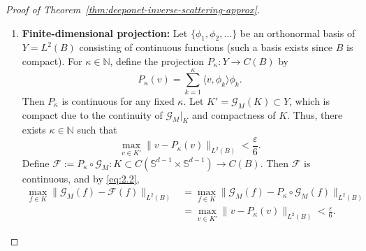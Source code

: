\documentclass{article}
\numberwithin{equation}{section}
\theoremstyle{plain}
\begin{document}
\begin{proof}[Proof of Theorem~\ref{thm:deeponet-inverse-scattering-approx}]
\begin{enumerate}
			\item \textbf{Finite-dimensional projection:}  
			Let $\{\phi_1, \phi_2, \dots\}$ be an orthonormal basis of $Y = L^2(B)$ consisting of continuous functions (such a basis exists since $B$ is compact). For $\kappa \in \mathbb{N}$, define the projection $P_\kappa: Y \to C(B)$ by
			\begin{equation*}
				P_\kappa(v) = \sum_{k=1}^\kappa \langle v, \phi_k \rangle \phi_k.
			\end{equation*}
			Then $P_\kappa$ is continuous for any fixed $\kappa$. Let $K' = \mathscr{G}_M(K) \subset Y$, which is compact due to the continuity of $\mathscr{G}_M|_K$ and compactness of $K$. Thus, there exists $\kappa \in \mathbb{N}$ such that
			\begin{equation}
				\max_{v \in K'} \| v - P_\kappa(v) \|_{L^2(B)} < \frac{\varepsilon}{6}. \label{eq:2.2}
			\end{equation}
			Define $\mathcal{F} := P_\kappa \circ \mathscr{G}_M: K \subset C(\mathbb{S}^{d-1} \times \mathbb{S}^{d-1}) \to C(B)$. Then $\mathcal{F}$ is continuous, and by \eqref{eq:2.2},
			\begin{equation}
				\begin{aligned}
					\max_{f \in K} \| \mathscr{G}_M(f) - \mathcal{F}(f) \|_{L^2(B)} 
					&= \max_{f \in K} \| \mathscr{G}_M(f) - P_\kappa \circ \mathscr{G}_M(f) \|_{L^2(B)} \\ 
					&= \max_{v \in K'} \| v - P_\kappa(v) \|_{L^2(B)} < \frac{\varepsilon}{6}.
				\end{aligned} \label{eq:2.3}
			\end{equation}
			

\end{enumerate}
\end{proof}
\end{document}
